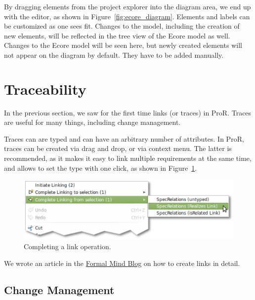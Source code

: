 By dragging elements from the project explorer into the diagram area, we end up with the editor, as shown in Figure~\ref{fig:ecore_diagram}.  Elements and labels can be customized as one sees fit.  Changes to the model, including the creation of new elements, will be reflected in the tree view of the Ecore model as well.  Changes to the Ecore model will be seen here, but newly created elements will not appear on the diagram by default.  They have to be added manually.

\section{Traceability}

In the previous section, we saw for the first time links (or traces) in ProR.  Traces are useful for many things, including change management.

Traces can are typed and can have an arbitrary number of attributes.  In ProR, traces can be created via drag and drop, or via context menu.  The latter is recommended, as it makes it easy to link multiple requirements at the same time, and allows to set the type with one click, as shown in Figure~\ref{fig:linking-finish}.

\begin{figure}[h!]
  \centering
  \includegraphics[width=0.6\linewidth]{../se-images/linking-finish.png}
  \caption{Completing a link operation.}
  \label{fig:linking-finish}
\end{figure}

\begin{info}
We wrote an article in the \href{http://formalmind.com/de/blog/better-link-creation-rmf-pror-070}{Formal Mind Blog} on how to create links in detail.
\end{info}

\subsection{Change Management}

